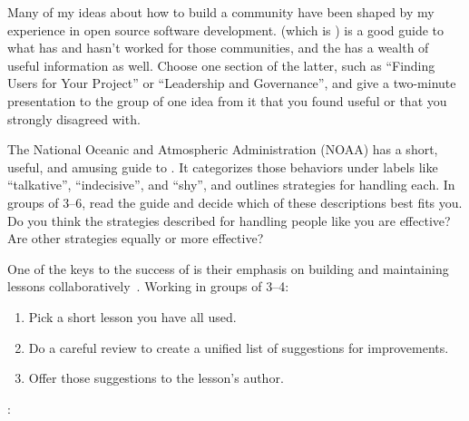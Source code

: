 
Many of my ideas about how to build a community
have been shaped by my experience in open source software development.
\cite{Foge2005} (which is )
is a good guide to what has and hasn't worked for those communities,
and the 
has a wealth of useful information as well.
Choose one section of the latter,
such as ``Finding Users for Your Project''
or ``Leadership and Governance'',
and give a two-minute presentation to the group of one idea from it
that you found useful or that you strongly disagreed with.


The National Oceanic and Atmospheric Administration (NOAA)
has a short, useful, and amusing guide to
.
It categorizes those behaviors under labels like ``talkative'', ``indecisive'', and ``shy'',
and outlines strategies for handling each.
In groups of 3--6,
read the guide and decide which of these descriptions best fits you.
Do you think the strategies described for handling people like you are effective?
Are other strategies equally or more effective?


One of the keys to the success of 
is their emphasis on building and maintaining lessons collaboratively~\cite{Wils2016,Deve2018}.
Working in groups of 3--4:

\begin{enumerate}

\item
  Pick a short lesson you have all used.

\item
  Do a careful review to create a unified list of suggestions for improvements.

\item
  Offer those suggestions to the lesson's author.

\end{enumerate}


:

